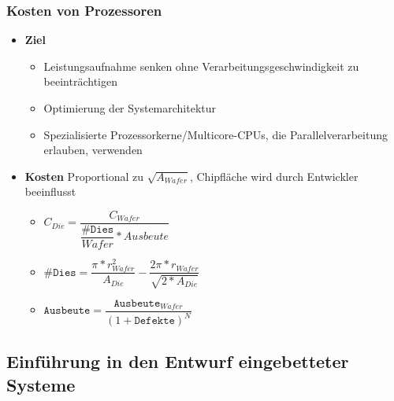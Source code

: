 \subsubsection{Kosten von Prozessoren}
\begin{itemize}
	\item \textbf{Ziel}
	\begin{itemize}
		\item Leistungsaufnahme senken ohne Verarbeitungsgeschwindigkeit zu beeinträchtigen
		\item Optimierung der Systemarchitektur
		\item Spezialisierte Prozessorkerne/Multicore-CPUs, die Parallelverarbeitung erlauben, verwenden
	\end{itemize}
	\item \textbf{Kosten} Proportional zu $\sqrt{A_{Wafer}}$, Chipfläche wird durch Entwickler beeinflusst
	\begin{itemize}
		\item $C_{Die}=\dfrac{C_{Wafer}}{\dfrac{\texttt{\#Dies}}{Wafer}*Ausbeute}$
		\item $\texttt{\#Dies}=\dfrac{\pi*r_{Wafer}^2}{A_{Die}}-\dfrac{2\pi*r_{Wafer}}{\sqrt{2*A_{Die}}}$
		\item $\texttt{Ausbeute}=\dfrac{\texttt{Ausbeute}_{Wafer}}{(1+\texttt{Defekte})^N}$
	\end{itemize}
\end{itemize}

\subsection{Einführung in den Entwurf eingebetteter Systeme}

